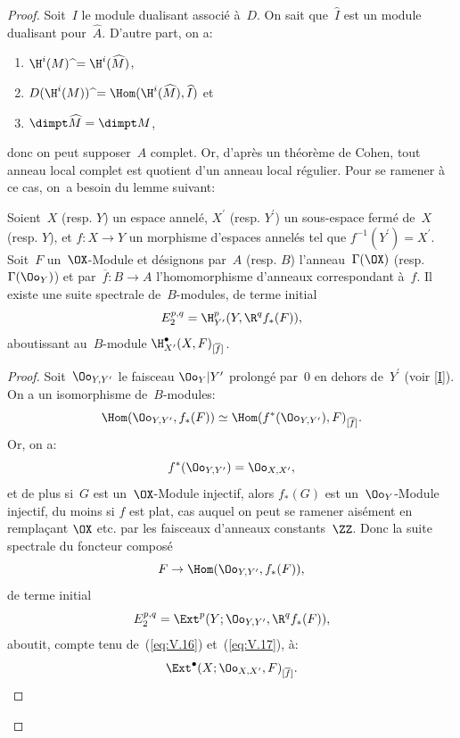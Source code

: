\begin{proof}
Soit~$I$ le module dualisant associ\'e \`a~$D$. On sait que~$\widehat{I}$ est un module dualisant pour~$\widehat{A}$. D'autre part, on a:
\begin{enumerate}
\item[] $\H^{i}(M)\;\widehat{\hbox{}}=\H^{i}(\widehat{M})$,
\item[] $D(\H^{i}(M))\;\widehat{\hbox{}}=\Hom(\H^{i}(\widehat{M}), \widehat{I})$ et
\item[] $\dimpt\widehat{M}=\dimpt M$,
\end{enumerate}
\noindent
donc on peut supposer~$A$ complet. Or, d'apr\`es un th\'eor\`eme de Cohen, tout anneau local complet est quotient d'un anneau local r\'egulier. Pour se ramener \`a ce cas, on~a besoin du lemme suivant:

\begin{lemme} \label{V.3.2}
Soient~$X$ (resp. $Y$) un espace annel\'e, $X^{\prime}$ (resp. $Y^{\prime}$) un sous-espace ferm\'e de~$X$ (resp. $Y$), et $f\colon X\to Y$ un morphisme d'espaces annel\'es tel que $f^{-1}(Y^{\prime})=X^{\prime}$. Soit~$F$ un~$\OX$-Module et d\'esignons par~$A$ (resp. $B$) l'anneau~$\Gamma(\OX)$ (resp. $\Gamma(\Oo_{Y})$) et par~$\overline{f}\colon B\to A$ l'homomorphisme d'anneaux correspondant \`a~$f$. Il existe une suite spectrale de~$B$-modules, de terme initial
\begin{equation} \label{eq:V.15} E_{2}^{p, q}=\H_{Y^{\prime}}^{p}(Y, \R^{q}f_{\ast}(F)),
\end{equation}
aboutissant au~$B$-module $\H_{X^{\prime}}^{\bullet}(X, F)_{[\overline{f}]}$.
\end{lemme}

\begin{proof}
Soit~$\Oo_{Y, Y^{\prime}}$ le faisceau ${\Oo_{Y}}{|Y^{\prime}}$ prolong\'e par~$0$ en dehors de~$Y^{\prime}$ (voir \Exp \ref{I}). On a un isomorphisme de~$B$-modules:
\begin{equation} \label{eq:V.16} \Hom(\Oo_{Y, Y^{\prime}}, f_{\ast}(F))\simeq\Hom(f^{\ast}(\Oo_{Y, Y^{\prime}}), F)_{[\overline{f}]}.
\end{equation}
Or, on a:
\begin{equation} \label{eq:V.17} f^{\ast}(\Oo_{Y, Y^{\prime}})=\Oo_{X, X^{\prime}},
\end{equation}
et de plus si~$G$ est un~$\OX$-Module injectif, alors
$f_{\ast}(G)$ est un~$\Oo_{Y}$-Module injectif, du moins si $f$
est plat, cas auquel on peut se ramener ais\'ement en rempla\c cant
$\OX$ etc. par les faisceaux d'anneaux constants~$\ZZ$. Donc la
suite spectrale du foncteur compos\'e
$$F\to\Hom(\Oo_{Y, Y^{\prime}}, f_{\ast}(F)),
$$
de terme initial
$$E_{2}^{p, q}=\Ext^{p}(Y;\Oo_{Y, Y^{\prime}}, \R^{q}f_{\ast}(F)),
$$
aboutit, compte tenu de~(\ref{eq:V.16}) et~(\ref{eq:V.17}), \`a:
$$
\Ext^{\bullet}(X;\Oo_{X, X^{\prime}}, F)_{[\overline{f}]}.
$$


\end{proof}
\end{proof}

